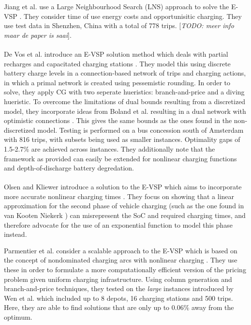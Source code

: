 \documentclass[]{article}
\newcommand{\todo}[1]{{\color{red}[\textit{TODO: #1}]}}
\begin{document}
Jiang et al. use a Large Neighbourhood Search (LNS) approach to solve the E-VSP \cite{Jiang2021}. They consider time of use energy costs and opportunisitic charging. They use test data in Shenzhen, China with a total of 778 trips. \todo{meer info maar de paper is saai}.\\\\

De Vos et al. introduce an E-VSP solution method which deals with partial recharges and capacitated charging stations \cite{deVos2024}. They model this using discrete battery charge levels in a connection-based network of trips and charging actions, in which a primal network is created using pessemistic rounding. In order to solve, they apply CG with two seperate hueristics: branch-and-price and a diving hueristic. To overcome the limitations of dual bounds resulting from a discretized model, they incorporate ideas from Boland et al. resulting in a dual network with optimistic connections \cite{Boland2017}. This gives the same bounds as the ones found in the non-discretized model. Testing is performed on a bus concession south of Amsterdam with 816 trips, with subsets being used as smaller instances. Optimality gaps of 1.5-2.7\% are achieved across instances. They additionally note that the framework as provided can easily be extended for nonlinear charging functions and depth-of-discharge battery degredation. \\\\

Olsen and Kliewer introduce a solution to the E-VSP which aims to incorporate more accurate nonlinear charging times \cite{Olsen2020}. They focus on showing that a linear approximation for the second phase of vehicle charging (such as the one found in van Kooten Niekerk \cite{vanKootenNiekerk2017}) can misrepresent the SoC and required charging times, and therefore advocate for the use of an exponential function to model this phase instead. 

Parmentier et al. consider a scalable approach to the E-VSP which is based on the concept of nondominated charging arcs with nonlinear charging \cite{Parmentier2023}. They use these in order to formulate a more computationally efficient version of the pricing problem given uniform charging infrastructure. Using column generation and branch-and-price techniques, they tested on the \textit{large} instances introduced by Wen et al. \cite{Wen2016} which included up to 8 depots, 16 charging stations and 500 trips. Here, they are able to find solutions that are only up to 0.06\% away from the optimum. 
\end{document}
